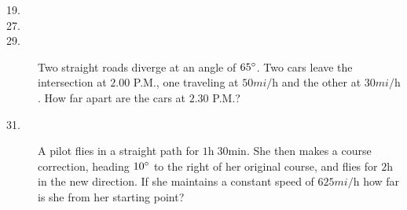 \begin{description}
\item [19.]   
\columnsep =30pt
 

\item [27.]
\columnsep =30pt
 

\item [29.]
Two straight roads diverge at an angle of $65 \mbox{{\ensuremath{{}^\circ}}}$. Two cars leave the intersection at $2.00$ P.M., one traveling at $50 mi/\mbox{h}$ and the other at $30 mi/\mbox{h}$. How far apart are the cars at $2.30$ P.M.? 

\item [31.] A pilot flies
in a straight path for $1 \mbox{h}\; 30 \mbox{min}$. She then makes a course correction, heading $10 \mbox{{\ensuremath{{}^\circ}}}$ to the right of her original course, and flies for $2 \mbox{h}$ in the new direction. If she
maintains a constant speed of $625 mi/\mbox{h}$ how far is she from her starting point? 


\end{description}
